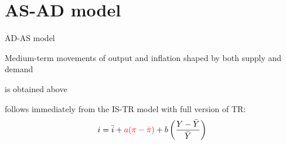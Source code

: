 \documentclass{beamer}
\newcommand{\tb}[1]{{\color{blue}{\textbf{#1}}}}
\newcommand{\tr}[1]{{\color{red}{\textbf{#1}}}}
\newenvironment{mytemize}
{\vfill\itemize[nolistsep,itemsep=\fill,label=\color{blue}{$\triangleright$}]}
  {\enditemize}
\begin{document}
\section{AS-AD model}
%
%
%
%
%
\begin{frame}{AD-AS model}
  \begin{mytemize}
  \item Medium-term movements of output and inflation shaped by both supply and demand
  \item \tb{AS} is obtained above
  \item \tr{AD} follows immediately from the IS-TR model with full version of TR:
	$$i = \bar i + \textcolor{red}{a(\pi - \bar \pi)} + b\left(\frac{Y- \bar Y}{\bar Y}\right)$$
  \end{mytemize}
\end{frame}
\end{document}
